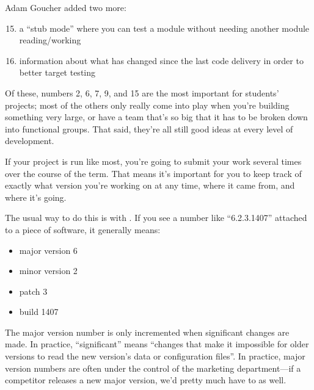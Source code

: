 \documentclass{report}
\begin{document}
\noindent Adam Goucher added two more:

\begin{enumerate}
\setcounter{enumi}{14}

  \item a ``stub mode'' where you can test a module without needing
  another module reading/working

  \item information about what has changed since the last code
  delivery in order to better target testing

\end{enumerate}

Of these, numbers 2, 6, 7, 9, and 15 are the most important for
students' projects; most of the others only really come into play when
you're building something very large, or have a team that's so big
that it has to be broken down into functional groups.  That said,
they're all still good ideas at every level of development.


If your project is run like most, you're going to submit your work
several times over the course of the term.  That means it's important
for you to keep track of exactly what version you're working on at any
time, where it came from, and where it's going.

The usual way to do this is with .  If you
see a number like ``6.2.3.1407'' attached to a piece of software, it
generally means:

\begin{itemize}

  \item major version 6

  \item minor version 2

  \item patch 3

  \item build 1407

\end{itemize}

The major version number is only incremented when significant changes
are made.  In practice, ``significant'' means ``changes that make it
impossible for older versions to read the new version's data or
configuration files''.  In practice, major version numbers are often
under the control of the marketing department---if a competitor
releases a new major version, we'd pretty much have to as well.
\end{document}
